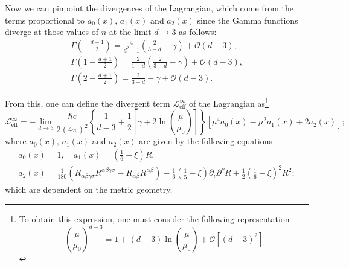 Now we can pinpoint the divergences of the Lagrangian, which come from the terms proportional to $a_0(x),\,a_1(x)$ and $a_2(x)$ since the Gamma functions diverge at those values of $n$ at the limit $d\to 3$ as follows:
\begin{subequations}\label{eq: Gamma Expansion}
	\begin{gather}
		\Gamma\left(-\frac{d+1}{2}\right)=\frac{4}{d^2-1}\left(\frac{2}{3-d}-\gamma\right)+\mathcal{O}(d-3),\\
		\Gamma\left(1-\frac{d+1}{2}\right)=\frac{2}{1-d}\left(\frac{2}{3-d}-\gamma\right)+\mathcal{O}(d-3),\\
		\Gamma\left(2-\frac{d+1}{2}\right)=\frac{2}{3-d}-\gamma+\mathcal{O}(d-3).
	\end{gather}
\end{subequations}

From this, one can define the divergent term $\mathcal{L}_{\text{eff}}^\infty$ of the Lagrangian as\footnote{To obtain this expression, one must consider the following representation $$\left(\frac{\mu}{\mu_0}\right)^{d-3}=1+(d-3)\ln\left(\frac{\mu}{\mu_0}\right)+\mathcal{O}\left[(d-3)^2\right]$$}
\begin{equation}\label{eq: Div effective lagrangian}
	\mathcal{L}_{\text{eff}}^\infty=-\lim\limits_{d\to 3}\frac{\hbar c}{2(4\pi)^2}\left\{\frac{1}{d-3}+\frac{1}{2}\left[\gamma+2\ln\left(\frac{\mu}{\mu_0}\right)\right]\right\}\left[\mu^4a_0(x)-\mu^2a_1(x)+2a_2(x)\right];
\end{equation}
where  $a_0(x),\,a_1(x)$ and $a_2(x)$ are given by the following equations
\begin{subequations}
	\begin{gather}
		a_0(x)=1,\quad a_1(x)=\left(\frac{1}{6}-\xi\right)R,\tag{\theequation \,\,a,b}\\
		a_2(x)=\frac{1}{180}\left(R_{\alpha\beta\gamma\sigma}R^{\alpha\beta\gamma\sigma}-R_{\alpha\beta}R^{\alpha\beta}\right)-\frac{1}{6}\left(\frac{1}{5}-\xi\right)\partial_\nu\partial^\nu R+\frac{1}{2}\left(\frac{1}{6}-\xi\right)^2R^2;\tag{\theequation \,\,c}
	\end{gather}
\end{subequations}
which are dependent on the metric geometry.

